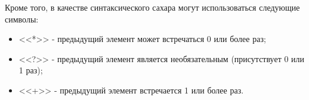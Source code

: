 Кроме того, в качестве синтаксического сахара могут использоваться следующие символы:

\begin{itemize}
    \item <<*>> - предыдущий элемент может встречаться 0 или более раз;
    \item <<?>> - предыдущий элемент является необязательным (присутствует 0 или 1 раз);
    \item <<+>> - предыдущий элемент встречается 1 или более раз.
\end{itemize}

